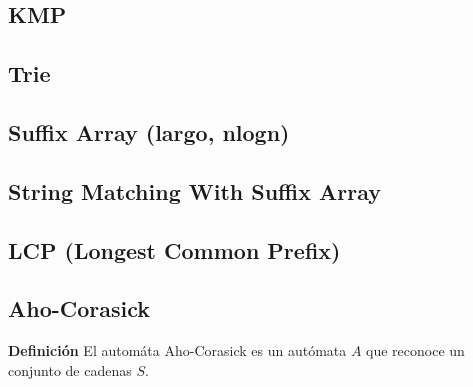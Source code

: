 \subsection{KMP}
\subsection{Trie}
\subsection{Suffix Array (largo, nlogn)}
\subsection{String Matching With Suffix Array}
\subsection{LCP (Longest Common Prefix)}
\subsection{Aho-Corasick}
\textbf{Definición}
El automáta Aho-Corasick es un autómata $A$ que reconoce un conjunto de cadenas $S$.


